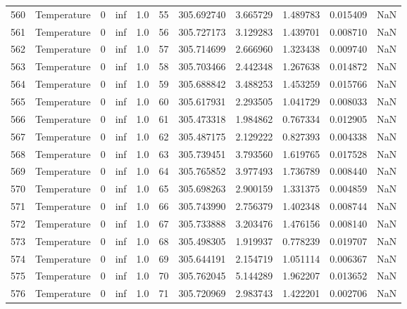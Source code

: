 \begin{tabular}{llrrrrrrrrr}
560 &  Temperature &       0 &  inf &  1.0 &   55 &  305.692740 &  3.665729 &  1.489783 &   0.015409 &      NaN \\
561 &  Temperature &       0 &  inf &  1.0 &   56 &  305.727173 &  3.129283 &  1.439701 &   0.008710 &      NaN \\
562 &  Temperature &       0 &  inf &  1.0 &   57 &  305.714699 &  2.666960 &  1.323438 &   0.009740 &      NaN \\
563 &  Temperature &       0 &  inf &  1.0 &   58 &  305.703466 &  2.442348 &  1.267638 &   0.014872 &      NaN \\
564 &  Temperature &       0 &  inf &  1.0 &   59 &  305.688842 &  3.488253 &  1.453259 &   0.015766 &      NaN \\
565 &  Temperature &       0 &  inf &  1.0 &   60 &  305.617931 &  2.293505 &  1.041729 &   0.008033 &      NaN \\
566 &  Temperature &       0 &  inf &  1.0 &   61 &  305.473318 &  1.984862 &  0.767334 &   0.012905 &      NaN \\
567 &  Temperature &       0 &  inf &  1.0 &   62 &  305.487175 &  2.129222 &  0.827393 &   0.004338 &      NaN \\
568 &  Temperature &       0 &  inf &  1.0 &   63 &  305.739451 &  3.793560 &  1.619765 &   0.017528 &      NaN \\
569 &  Temperature &       0 &  inf &  1.0 &   64 &  305.765852 &  3.977493 &  1.736789 &   0.008440 &      NaN \\
570 &  Temperature &       0 &  inf &  1.0 &   65 &  305.698263 &  2.900159 &  1.331375 &   0.004859 &      NaN \\
571 &  Temperature &       0 &  inf &  1.0 &   66 &  305.743990 &  2.756379 &  1.402348 &   0.008744 &      NaN \\
572 &  Temperature &       0 &  inf &  1.0 &   67 &  305.733888 &  3.203476 &  1.476156 &   0.008140 &      NaN \\
573 &  Temperature &       0 &  inf &  1.0 &   68 &  305.498305 &  1.919937 &  0.778239 &   0.019707 &      NaN \\
574 &  Temperature &       0 &  inf &  1.0 &   69 &  305.644191 &  2.154719 &  1.051114 &   0.006367 &      NaN \\
575 &  Temperature &       0 &  inf &  1.0 &   70 &  305.762045 &  5.144289 &  1.962207 &   0.013652 &      NaN \\
576 &  Temperature &       0 &  inf &  1.0 &   71 &  305.720969 &  2.983743 &  1.422201 &   0.002706 &      NaN \\

\end{tabular}
